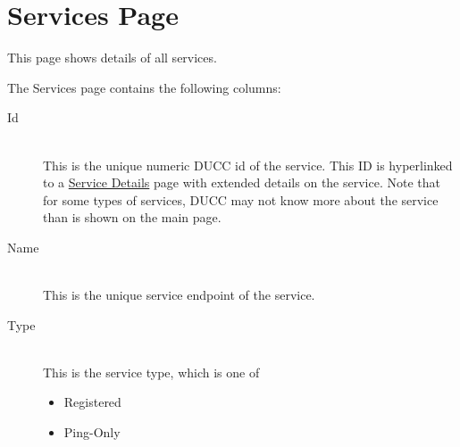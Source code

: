 
    \section{Services Page}
    \label{ws:services-page}
        This page shows details of all services.           

        The Services page contains the following columns: 
        \begin{description}

            \item[Id] \hfill \\
              This is the unique numeric DUCC id of the service.  This ID is hyperlinked to a
              \hyperref[sec:ws-service-details]{Service Details} page with extended
              details on the service.  Note that for some types of services, DUCC may not
              know more about the service than is shown on the main page.

            \item[Name] \hfill \\
              This is the unique service endpoint of the service.  
              
            \item[Type] \hfill \\
              This is the service type, which is one of
              \begin{itemize}
                \item Registered
                \item Ping-Only
              \end{itemize}
              

\end{description}
